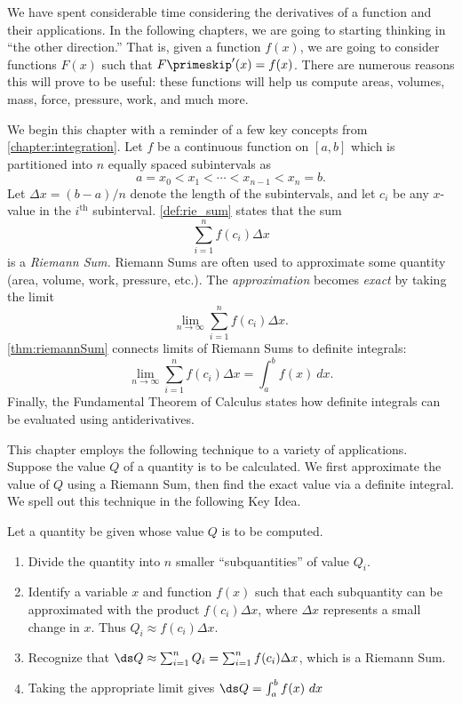 
We have spent considerable time considering the derivatives of a function and their applications. In the following chapters, we are going to starting thinking in ``the other direction.'' That is, given a function $f(x)$, we are going to consider functions $F(x)$ such that $F\primeskip'(x) = f(x)$. There are numerous reasons this will prove to be useful: these functions will help us compute areas, volumes, mass, force, pressure, work, and much more.









We begin this chapter with a reminder of a few key concepts from \autoref{chapter:integration}. Let $f$ be a continuous function on $[a,b]$ which is partitioned into $n$ equally spaced subintervals as 
\[a=x_0 < x_1 < \cdots < x_{n-1}<x_n=b.\]
Let $\Delta x=(b-a)/n$ denote the length of the  subintervals, and let $c_i$ be any $x$-value in the $i^{\text{th}}$ subinterval. \autoref{def:rie_sum} states that the sum
\[\sum_{i=1}^n f(c_i)\Delta x\]
is a \textit{Riemann Sum.} Riemann Sums are often used to approximate some quantity (area, volume, work, pressure, etc.). The \textit{approximation} becomes \textit{exact} by taking the limit 
\[\lim_{n\to\infty} \sum_{i=1}^n f(c_i)\Delta x.\]
\autoref{thm:riemannSum} connects limits of Riemann Sums to definite integrals:
\[\lim_{n\to\infty} \sum_{i=1}^n f(c_i)\Delta x = \int_a^b f(x)\ dx.\]
Finally, the Fundamental Theorem of Calculus states how definite integrals can be evaluated using antiderivatives. 

This chapter employs the following technique to a variety of applications. Suppose the value $Q$ of a quantity is to be calculated. We first approximate the value of $Q$ using a Riemann Sum, then find the exact value via a definite integral. We spell out this technique in the following Key Idea.

\begin{keyidea}\label{idea:app_of_defint}
Let a quantity be given whose value $Q$ is to be computed.
\begin{enumerate}
\item	Divide the quantity into $n$ smaller ``subquantities'' of value $Q_i$.
\item	Identify a variable $x$ and function $f(x)$ such that each subquantity can be approximated with the product $f(c_i)\Delta x$, where $\Delta x$ represents a small change in $x$. Thus $Q_i \approx f(c_i)\Delta x$.
\item	Recognize that $\ds Q\approx \sum_{i=1}^n Q_i = \sum_{i=1}^n f(c_i)\Delta x$, which is a Riemann Sum.
\item	Taking the appropriate limit gives $\ds Q = \int_a^b f(x)\ dx$
\end{enumerate}
\end{keyidea}

